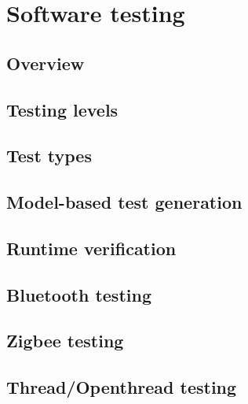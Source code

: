 \chapter{Software testing}

\section{Overview}

\section{Testing levels}

\section{Test types}

\section{Model-based test generation}

\section{Runtime verification}

\section{Bluetooth testing}

\section{Zigbee testing}

\section{Thread/Openthread testing}